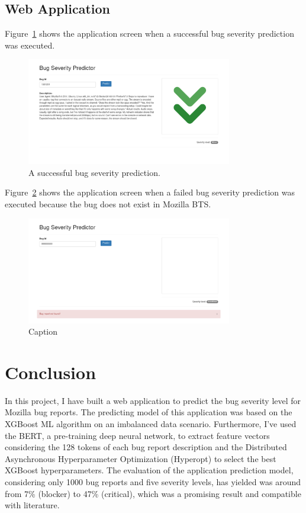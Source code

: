 \documentclass[a4paper]{article}
\begin{document}
\subsection{Web Application}
Figure~\ref{fig:succes-prediction} shows the application screen when a successful bug severity prediction was executed.

\begin{figure}[h!]
    \centering
    \includegraphics[width=0.8\textwidth]{figures/sucess-prediction.png}
    \caption{A successful bug severity prediction.}
    \label{fig:succes-prediction}
\end{figure}

Figure~\ref{fig:failed-prediction} shows the application screen when a failed bug severity prediction was executed because the bug does not exist in Mozilla BTS.

\begin{figure}[h!]
    \centering
    \includegraphics[width=0.8\textwidth]{figures/failed-prediction.png}
    \caption{Caption}
    \label{fig:failed-prediction}
\end{figure}

\section{Conclusion}
In this project, I have built a web application to predict the bug severity level for Mozilla bug reports. The predicting model of this application was based on the XGBoost ML algorithm on an imbalanced data scenario. Furthermore, I've used the BERT, a pre-training deep neural network, to extract feature vectors considering the 128 tokens of each bug report description and the Distributed Asynchronous Hyperparameter Optimization (Hyperopt) to select the best XGBoost hyperparameters.  The evaluation of the application prediction model, considering only 1000 bug reports and five severity levels, has yielded was around from 7\% (blocker) to 47\% (critical), which was a promising result and compatible with literature.
  

\newpage
\bigskip
\printbibliography

\end{document}
